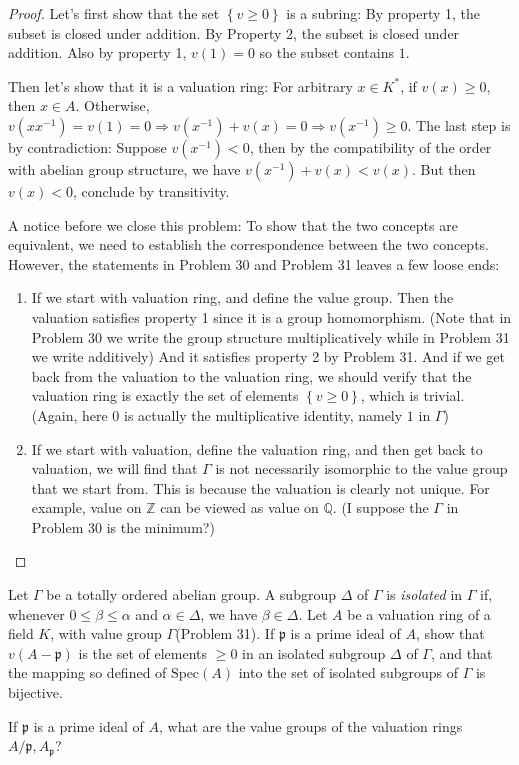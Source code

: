 \documentclass{solution}
\begin{document}
\begin{proof}
    Let's first show that the set $\left\lbrace v \ge 0 \right\rbrace$ is a subring: By property 1, the subset is closed under addition. By Property 2, the subset is closed under addition. Also by property 1, $v(1) = 0$ so the subset contains $1$.
    
    Then let's show that it is a valuation ring: For arbitrary $x \in K^*$, if $v(x) \ge 0$, then $x \in A$. Otherwise, $v(x x ^{-1}) = v(1) = 0 \Rightarrow v(x ^{-1}) + v(x) = 0 \Rightarrow v(x ^{-1}) \ge 0$. The last step is by contradiction: Suppose $v(x ^{-1}) \lt 0$, then by the compatibility of the order with abelian group structure, we have $v(x ^{-1}) + v(x) \lt v(x)$. But then $v(x) \lt 0$, conclude by transitivity.

    {
        \color{red}
        A notice before we close this problem: To show that the two concepts are equivalent, we need to establish the correspondence between the two concepts. However, the statements in Problem 30 and Problem 31 leaves a few loose ends:
        \begin{enumerate}
            \item If we start with valuation ring, and define the value group. Then the valuation satisfies property 1 since it is a group homomorphism. (Note that in Problem 30 we write the group structure multiplicatively while in Problem 31 we write additively) And it satisfies property 2 by Problem 31. And if we get back from the valuation to the valuation ring, we should verify that the valuation ring is exactly the set of elements $\left\lbrace v \ge 0 \right\rbrace$, which is trivial. (Again, here $0$ is actually the multiplicative identity, namely $1$ in $\Gamma$)
            \item If we start with valuation, define the valuation ring, and then get back to valuation, we will find that $\Gamma$ is not necessarily isomorphic to the value group that we start from. This is because the valuation is clearly not unique. For example, value on $\mathbb{Z}$ can be viewed as value on $\mathbb{Q}$. (I suppose the $\Gamma$ in Problem 30 is the minimum?)
        \end{enumerate}
    }
\end{proof}

\begin{problem}
    Let $\Gamma$ be a totally ordered abelian group. A subgroup $\Delta$ of $\Gamma$ is \textit{isolated} in $\Gamma$ if, whenever $0 \le \beta \le \alpha$ and $\alpha \in \Delta$, we have $\beta \in \Delta$. Let $A$ be a valuation ring of a field $K$, with value group $\Gamma$(Problem 31). If $\mathfrak{p}$ is a prime ideal of $A$, show that $v(A - \mathfrak{p})$ is the set of elements $\ge 0$ in an isolated subgroup $\Delta$ of $\Gamma$, and that the mapping so defined of $\mathrm{Spec}(A)$ into the set of isolated subgroups of $\Gamma$ is bijective.

    If $\mathfrak{p}$ is a prime ideal of $A$, what are the value groups of the valuation rings $A / \mathfrak{p}, A_{\mathfrak{p}}$?
\end{problem}
\end{document}
